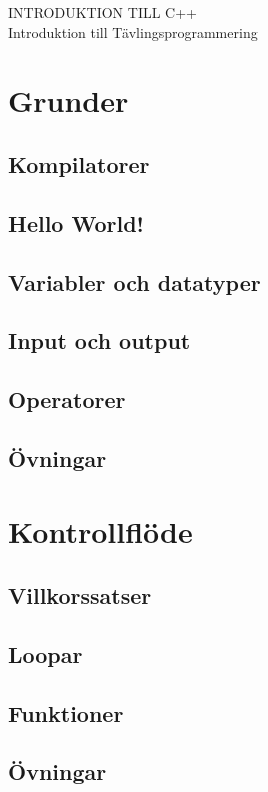 \documentclass[10pt,a4paper]{article}
\theoremstyle{problem}
\begin{document}
\Large{INTRODUKTION TILL C++}
\\
\small{Introduktion till Tävlingsprogrammering}


\section{Grunder}
	
\subsection{Kompilatorer}

\subsection{Hello World!}

\subsection{Variabler och datatyper}

\subsection{Input och output}

\subsection{Operatorer}

\subsection{Övningar}


\section{Kontrollflöde}
\subsection{Villkorssatser}

\subsection{Loopar}

\subsection{Funktioner}

\subsection{Övningar}

\end{document}
